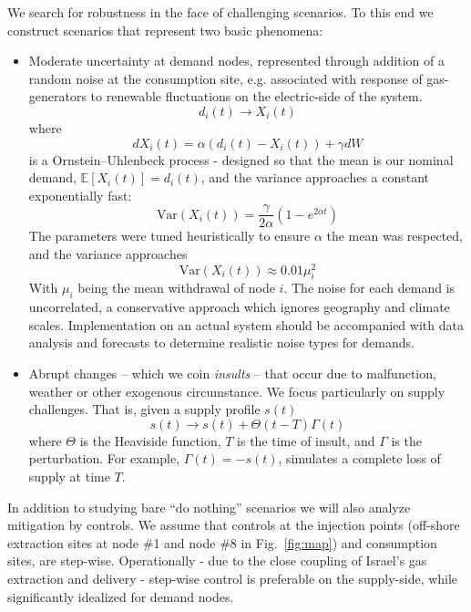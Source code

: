 

We search for robustness in the face of challenging scenarios. To this end we construct scenarios that represent two basic phenomena:
\begin{itemize}
    \item Moderate uncertainty at demand nodes, represented through addition of a random noise at the consumption site, e.g. associated with  response of gas-generators to renewable fluctuations on the electric-side of the system.
    \begin{equation}
        d_i(t) \to X_i(t)
    \end{equation}
    where
    \begin{equation}
        dX_i(t) = \alpha(d_i(t) - X_i(t)) + \gamma dW
    \end{equation}
    is a Ornstein–Uhlenbeck process - designed so that the mean is our nominal demand, $\mathbb{E}[X_i(t)] = d_i(t)$, and the variance approaches a constant exponentially fast:
    \begin{equation}
        \text{Var}(X_i(t)) = \frac{\gamma}{2\alpha}\left(1 - e^{2\alpha t} \right)
    \end{equation}
    The parameters were tuned heuristically to ensure $\alpha$ the mean was respected, and the variance approaches
    \begin{equation}
        \text{Var}(X_i(t)) \approx 0.01 \mu_i^2
    \end{equation}
    With $\mu_i$ being the mean withdrawal of node $i$. The noise for each demand is uncorrelated, a conservative approach which ignores geography and climate scales. Implementation on an actual system should be accompanied with data analysis and forecasts to determine realistic noise types for demands.
    \item Abrupt changes -- which we coin \emph{insults} -- that occur due to malfunction, weather or other exogenous circumstance. We focus particularly on supply challenges. That is, given a supply profile $s(t)$
    \begin{equation}
        s(t) \to s(t) + \Theta(t-T)\Gamma(t)
    \end{equation}
    where $\Theta$ is the Heaviside function, $T$ is the time of insult, and $\Gamma$ is the perturbation. For example, $\Gamma(t) = -s(t)$, simulates a complete loss of supply at time $T$.
\end{itemize}

In addition to studying bare ``do nothing'' scenarios we will also analyze mitigation by controls.  We assume that controls at the injection points (off-shore extraction sites at node \#1 and node \#8 in Fig.~\ref{fig:map}) and consumption sites, are step-wise. Operationally - due to the close coupling of Israel's gas extraction and delivery - step-wise control is preferable on the supply-side, while significantly idealized for demand nodes.

